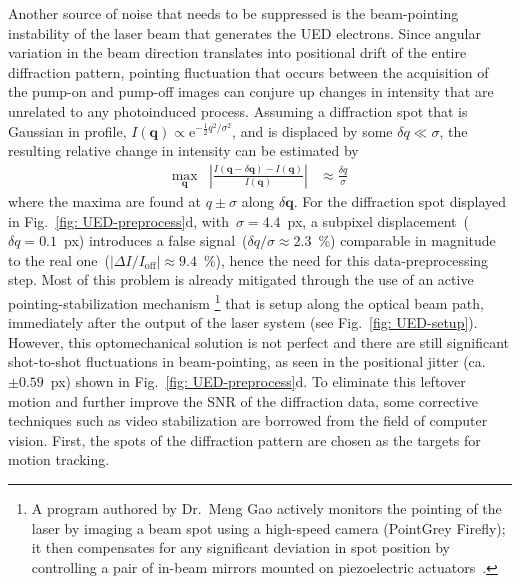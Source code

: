 Another source of noise that needs to be suppressed is the beam-pointing instability
of the laser beam that generates the UED electrons.
%
Since angular variation in the beam direction translates into
positional drift of the entire diffraction pattern,
pointing fluctuation that occurs between the acquisition of the pump-on and pump-off images
can conjure up changes in intensity that are unrelated to any photoinduced process.
%
Assuming a diffraction spot that is Gaussian in profile,
$I(\boldsymbol{q}) \propto \text{e}^{-\frac{1}{2}q^2 / \sigma^2}$,
and is displaced by some $\delta q \ll \sigma$,
the resulting relative change in intensity can be estimated by
%
\begin{equation}
  \begin{aligned}
      \max\limits_{\boldsymbol{q}}
        & \left\lvert \frac{I(\boldsymbol{q} - \delta \boldsymbol{q}) - I(\boldsymbol{q})}{I(\boldsymbol{q})} \right\rvert
        & \approx \frac{\delta q}{\sigma}
  \end{aligned}
\end{equation}
%
where the maxima are found at $q \pm \sigma$ along $\delta \boldsymbol{q}$.
%
For the diffraction spot displayed in Fig.~\ref{fig: UED-preprocess}d,
with~$\sigma = 4.4$~px, a subpixel displacement~($\delta q = 0.1$~px) introduces
a false signal~($\delta q/\sigma \approx 2.3$~\%)
comparable in magnitude to the real one~($|\Delta I/I_\text{off}| \approx 9.4$~\%),
hence the need for this data-preprocessing step.
%
Most of this problem is already mitigated through the use of an active pointing-stabilization mechanism%
\footnote{
A program authored by Dr.~Meng Gao actively monitors the pointing of the laser
by imaging a beam spot using a high-speed camera (PointGrey Firefly);
it then compensates for any significant deviation in spot position
by controlling a pair of in-beam mirrors mounted on piezoelectric actuators~\cite{Ray-thesis}.
}
that is setup along the optical beam path, immediately after the output of the laser system
(see Fig.~\ref{fig: UED-setup}).
%
However, this optomechanical solution is not perfect and
there are still significant shot-to-shot fluctuations in beam-pointing,
as seen in the positional jitter (ca.~$\pm 0.59$~px) shown in Fig.~\ref{fig: UED-preprocess}d.
%
To eliminate this leftover motion and further improve the SNR of the diffraction data,
some corrective techniques such as video stabilization are borrowed
from the field of computer vision.
%
First, the spots of the diffraction pattern are chosen as the targets for motion tracking.
